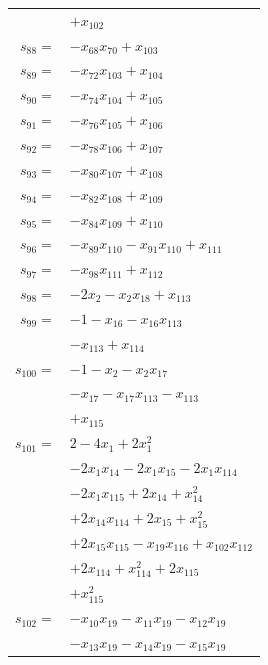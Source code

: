 \begin{longtable}{@{}r@{\;}l@{}}
 & \(\displaystyle +x_{102}\) \\[3pt]
\(s_{88}=\) & \(\displaystyle -x_{68}x_{70} +x_{103}\) \\[3pt]
\(s_{89}=\) & \(\displaystyle -x_{72}x_{103} +x_{104}\) \\[3pt]
\(s_{90}=\) & \(\displaystyle -x_{74}x_{104} +x_{105}\) \\[3pt]
\(s_{91}=\) & \(\displaystyle -x_{76}x_{105} +x_{106}\) \\[3pt]
\(s_{92}=\) & \(\displaystyle -x_{78}x_{106} +x_{107}\) \\[3pt]
\(s_{93}=\) & \(\displaystyle -x_{80}x_{107} +x_{108}\) \\[3pt]
\(s_{94}=\) & \(\displaystyle -x_{82}x_{108} +x_{109}\) \\[3pt]
\(s_{95}=\) & \(\displaystyle -x_{84}x_{109} +x_{110}\) \\[3pt]
\(s_{96}=\) & \(\displaystyle -x_{89}x_{110} -x_{91}x_{110} +x_{111}\) \\[3pt]
\(s_{97}=\) & \(\displaystyle -x_{98}x_{111} +x_{112}\) \\[3pt]
\(s_{98}=\) & \(\displaystyle -2x_{2} -x_{2}x_{18} +x_{113}\) \\[3pt]
\(s_{99}=\) & \(\displaystyle -1 -x_{16} -x_{16}x_{113}\) \\
 & \(\displaystyle -x_{113} +x_{114}\) \\[3pt]
\(s_{100}=\) & \(\displaystyle -1 -x_{2} -x_{2}x_{17}\) \\
 & \(\displaystyle -x_{17} -x_{17}x_{113} -x_{113}\) \\
 & \(\displaystyle +x_{115}\) \\[3pt]
\(s_{101}=\) & \(\displaystyle 2 -4x_{1} +2x_{1}^{2}\) \\
 & \(\displaystyle -2x_{1}x_{14} -2x_{1}x_{15} -2x_{1}x_{114}\) \\
 & \(\displaystyle -2x_{1}x_{115} +2x_{14} +x_{14}^{2}\) \\
 & \(\displaystyle +2x_{14}x_{114} +2x_{15} +x_{15}^{2}\) \\
 & \(\displaystyle +2x_{15}x_{115} -x_{19}x_{116} +x_{102}x_{112}\) \\
 & \(\displaystyle +2x_{114} +x_{114}^{2} +2x_{115}\) \\
 & \(\displaystyle +x_{115}^{2}\) \\[3pt]
\(s_{102}=\) & \(\displaystyle -x_{10}x_{19} -x_{11}x_{19} -x_{12}x_{19}\) \\
 & \(\displaystyle -x_{13}x_{19} -x_{14}x_{19} -x_{15}x_{19}\) \\

\end{longtable}

